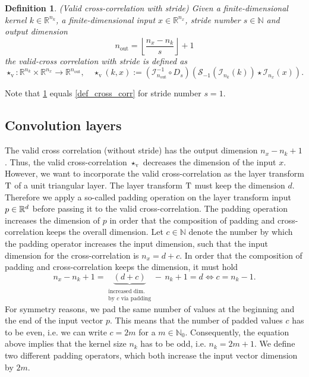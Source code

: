 \documentclass[twoside,a4paper]{article}
\newtheorem{definition}{Definition}
\begin{document}
\begin{definition}\label{def_cross_corr_stride}
	(Valid cross-correlation with stride)
	Given a finite-dimensional kernel $k \in \mathbb{R}^{n_k}$, a finite-dimensional
	input $x \in \mathbb{R}^{n_x}$, stride number $s \in \mathbb{N}$ and output dimension
	\begin{equation*}
		n_{\text{out}} = \left\lfloor \frac{n_x - n_k}{s} \right\rfloor + 1
	\end{equation*}
	the valid-cross correlation with stride is defined as
	\begin{equation*}
		\star_{\text{v}} : \mathbb{R}^{n_k} \times \mathbb{R}^{n_x} \to \mathbb{R}^{n_{\text{out}}},
		\quad \star_{\text{v}}(k,x) := 
		(\mathcal{I}_{n_{\text{out}}}^{-1} \circ D_s)
		(
			\mathcal{S}_{-1}( \mathcal{I}_{n_k}(k)) \star \mathcal{I}_{n_x}(x)
		)
		.
	\end{equation*}
\end{definition}

Note that \cref{def_cross_corr_stride} equals \cref{def_cross_corr} for stride number $s=1$.

\subsection{Convolution layers}

The valid cross correlation (without stride) has the output dimension $n_x - n_k + 1$.
Thus, the valid cross-correlation $\star_{\text{v}}$ decreases the dimension of the input $x$.
However, we want to incorporate the valid cross-correlation as the layer transform $\mathrm{T}$ of a
unit triangular layer. The layer transform $\mathrm{T}$ must keep the dimension $d$.
Therefore we apply a so-called padding operation on the layer transform input $p \in \mathbb{R}^d$ 
before passing it to the valid
cross-correlation. The padding operation increases the dimension of $p$ in order
that the composition of padding and cross-correlation keeps the overall dimension.
Let $c \in \mathbb{N}$ denote the number by which the padding operator increases 
the input dimension, such that the input dimension for the cross-correlation is $n_x = d+c$. 
In order that the composition of padding and cross-correlation keeps the dimension, it must hold
\begin{equation*}
	n_x - n_k + 1 = \underbrace{(d+c)}_{\substack{
		\text{increased dim.} \\
		\text{by } c \text{ via padding}
	}} - \, n_k + 1 = d \iff c = n_k-1
	.
\end{equation*}
For symmetry reasons, we pad the same number of values at the beginning and 
the end of the input vector $p$. This means that the number of padded values $c$ has to be even,
i.e. we can write $c=2m$ for a $m \in \mathbb{N}_0$.
Consequently, the equation above implies that the kernel size $n_k$ has to be odd, i.e. 
$n_k = 2m+1$. We define two different padding operators,
which both increase the input vector dimension by $2m$.
\end{document}
